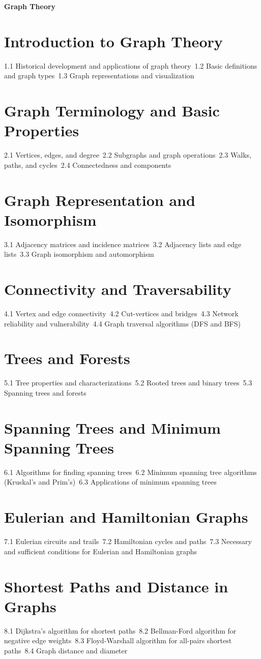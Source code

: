 {\LARGE \bf{Graph Theory}}
\section{Introduction to Graph Theory}
1.1 Historical development and applications of graph theory\
1.2 Basic definitions and graph types\
1.3 Graph representations and visualization\
\section{Graph Terminology and Basic Properties}
2.1 Vertices, edges, and degree\
2.2 Subgraphs and graph operations\
2.3 Walks, paths, and cycles\
2.4 Connectedness and components\
\section{Graph Representation and Isomorphism}
3.1 Adjacency matrices and incidence matrices\
3.2 Adjacency lists and edge lists\
3.3 Graph isomorphism and automorphism\
\section{Connectivity and Traversability}
4.1 Vertex and edge connectivity\
4.2 Cut-vertices and bridges\
4.3 Network reliability and vulnerability\
4.4 Graph traversal algorithms (DFS and BFS)\
\section{Trees and Forests}
5.1 Tree properties and characterizations\
5.2 Rooted trees and binary trees\
5.3 Spanning trees and forests\
\section{Spanning Trees and Minimum Spanning Trees}
6.1 Algorithms for finding spanning trees\
6.2 Minimum spanning tree algorithms (Kruskal's and Prim's)\
6.3 Applications of minimum spanning trees\
\section{Eulerian and Hamiltonian Graphs}
7.1 Eulerian circuits and trails\
7.2 Hamiltonian cycles and paths\
7.3 Necessary and sufficient conditions for Eulerian and Hamiltonian graphs\
\section{Shortest Paths and Distance in Graphs}
8.1 Dijkstra's algorithm for shortest paths\
8.2 Bellman-Ford algorithm for negative edge weights\
8.3 Floyd-Warshall algorithm for all-pairs shortest paths\
8.4 Graph distance and diameter\
